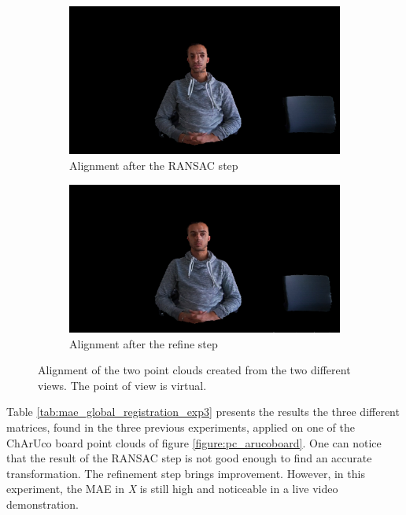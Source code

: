 \begin{figure}[H]
\centering
  \begin{subfigure}[b]{0.48 \textwidth}
    \includegraphics[width=\textwidth]{images/registration/ransac_myself_RGB.png}
    \caption{Alignment after the RANSAC step}
    \label{figure:ransac_myself_RGB}
  \end{subfigure}
  \hfill
  \begin{subfigure}[b]{0.48 \textwidth}
    \includegraphics[width=\textwidth]{images/registration/refine_myself_RGB.png}
    \caption{Alignment after the refine step}
    \label{figure:refine_myself_RGB}
  \end{subfigure}
  \caption{Alignment of the two point clouds created from the two different views. The point of view is virtual.}
  \label{figure:ransac_refine_myself_RGB}
\end{figure}

Table \ref{tab:mae_global_registration_exp3} presents the results the three different matrices, found in the three previous experiments, applied on one of the ChArUco board point clouds of figure \ref{figure:pc_arucoboard}. One can notice that the result of the RANSAC step is not good enough to find an accurate transformation. The refinement step brings improvement. However, in this experiment, the MAE in \textit{X} is still high and noticeable in a live video demonstration. 


